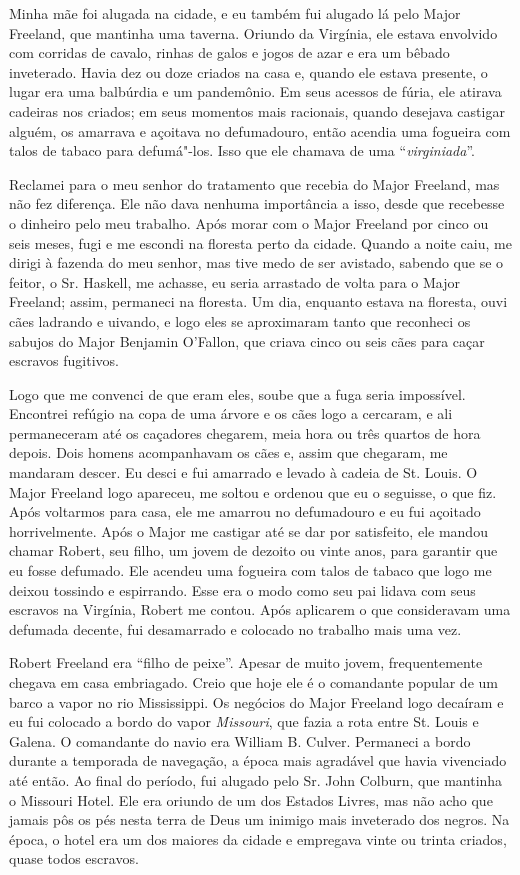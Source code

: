 Minha mãe foi alugada na cidade, e eu também fui alugado lá pelo Major
Freeland, que mantinha uma taverna. Oriundo da Virgínia, ele estava
envolvido com corridas de cavalo, rinhas de galos e jogos de azar e era
um bêbado inveterado. Havia dez ou doze criados na casa e, quando ele
estava presente, o lugar era uma balbúrdia e um pandemônio. Em seus
acessos de fúria, ele atirava cadeiras nos criados; em seus momentos
mais racionais, quando desejava castigar alguém, os amarrava e açoitava
no defumadouro, então acendia uma fogueira com talos de tabaco para
defumá"-los. Isso que ele chamava de uma ``\emph{virginiada}''.

Reclamei para o meu senhor do tratamento que recebia do Major Freeland,
mas não fez diferença. Ele não dava nenhuma importância a isso, desde
que recebesse o dinheiro pelo meu trabalho. Após morar com o Major
Freeland por cinco ou seis meses, fugi e me escondi na floresta perto da
cidade. Quando a noite caiu, me dirigi à fazenda do meu senhor, mas tive
medo de ser avistado, sabendo que se o feitor, o Sr. Haskell, me
achasse, eu seria arrastado de volta para o Major Freeland; assim,
permaneci na floresta. Um dia, enquanto estava na floresta, ouvi cães
ladrando e uivando, e logo eles se aproximaram tanto que reconheci os
sabujos do Major Benjamin O'Fallon, que criava cinco ou seis cães para
caçar escravos fugitivos.

Logo que me convenci de que eram eles, soube que a fuga seria
impossível. Encontrei refúgio na copa de uma árvore e os cães logo a
cercaram, e ali permaneceram até os caçadores chegarem, meia hora ou
três quartos de hora depois. Dois homens acompanhavam os cães e, assim
que chegaram, me mandaram descer. Eu desci e fui amarrado e levado à
cadeia de St. Louis. O Major Freeland logo apareceu, me soltou e ordenou
que eu o seguisse, o que fiz. Após voltarmos para casa, ele me amarrou
no defumadouro e eu fui açoitado horrivelmente. Após o Major me castigar
até se dar por satisfeito, ele mandou chamar Robert, seu filho, um jovem
de dezoito ou vinte anos, para garantir que eu fosse defumado. Ele
acendeu uma fogueira com talos de tabaco que logo me deixou tossindo e
espirrando. Esse era o modo como seu pai lidava com seus escravos na
Virgínia, Robert me contou. Após aplicarem o que consideravam uma
defumada decente, fui desamarrado e colocado no trabalho mais uma vez.

Robert Freeland era ``filho de peixe''. Apesar de muito jovem,
frequentemente chegava em casa embriagado. Creio que hoje ele é o
comandante popular de um barco a vapor no rio Mississippi. Os negócios
do Major Freeland logo decaíram e eu fui colocado a bordo do vapor
\emph{Missouri}, que fazia a rota entre St. Louis e Galena. O comandante
do navio era William B. Culver. Permaneci a bordo durante a temporada de
navegação, a época mais agradável que havia vivenciado até então. Ao
final do período, fui alugado pelo Sr. John Colburn, que mantinha o
Missouri Hotel. Ele era oriundo de um dos Estados Livres, mas não acho
que jamais pôs os pés nesta terra de Deus um inimigo mais inveterado dos
negros. Na época, o hotel era um dos maiores da cidade e empregava vinte
ou trinta criados, quase todos escravos.

